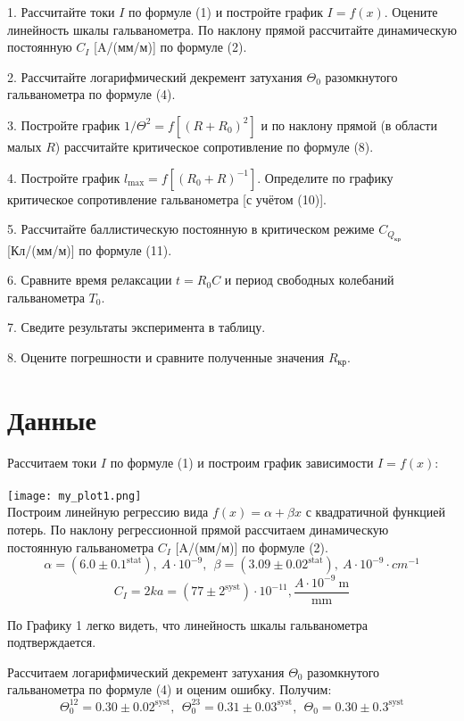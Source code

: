 1. Рассчитайте токи $I$ по формуле (1) и постройте график $I = f(x)$. Оцените линейность шкалы гальванометра. По наклону прямой рассчитайте динамическую постоянную $C_I$ [A/(мм/м)] по формуле (2).

2. Рассчитайте логарифмический декремент затухания $\Theta_0$ разомкнутого гальванометра по формуле (4).

3. Постройте график $1/{\Theta^2} = f[(R + R_0)^2]$ и по наклону прямой (в области малых $R$) рассчитайте критическое сопротивление по формуле (8).

4. Постройте график $l_{\text{max}} = f[(R_0 + R)^{-1}]$. Определите по графику критическое сопротивление гальванометра [с учётом (10)].

5. Рассчитайте баллистическую постоянную в критическом режиме $C_{Q_{\text{кр}}}$ [Кл/(мм/м)] по формуле (11).

6. Сравните время релаксации $t = R_0 C$ и период свободных колебаний гальванометра $T_0$.

7. Сведите результаты эксперимента в таблицу.

8. Оцените погрешности и сравните полученные значения $R_{\text{кр}}$.

\section{\label{sec:level1}Данные}

Рассчитаем токи $I$ по формуле (1) и построим график зависимости $I = f(x)$:\\
\\
\texttt{[image: my\_plot1.png]}\\

Построим линейную регрессию вида $f(x) = \alpha + \beta x$ с квадратичной функцией потерь. По наклону регрессионной прямой рассчитаем динамическую постоянную гальванометра $C_I$ [A/(мм/м)] по формуле (2).
$$ \alpha = (6.0 \pm 0.1^{\text{stat}}),~A \cdot 10^{-9},~~\beta = (3.09 \pm 0.02^{\text{stat}}),~A \cdot 10^{-9} \cdot cm^{-1}$$
$$ C_{I} = 2ka = (77 \pm 2^{\text{syst}}) \cdot 10^{-11}, \frac{A \cdot 10^{-9}~\text{m}}{\text{mm}} $$

По Графику 1 легко видеть, что линейность шкалы гальванометра подтверждается.

Рассчитаем логарифмический декремент затухания $\Theta_0$ разомкнутого гальванометра по формуле (4) и оценим ошибку. Получим:
$$\Theta_0^{12} = 0.30 \pm 0.02^{\text{syst}},~~\Theta_0^{23} = 0.31 \pm 0.03^{\text{syst}},~~\Theta_0 = 0.30 \pm 0.3^{\text{syst}}$$

